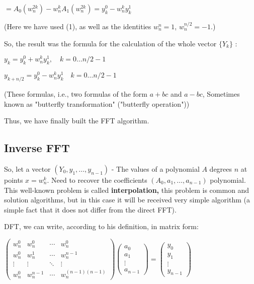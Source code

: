 $=A_{0}(w_{n}^{2k})-w_{n}^{k}A_{1}(w_{n}^{2k})=y_{k}^{0}-w_{n}^{k}y_{k}^{1}$

(Here we have used (1), as well as the identities $w_n ^ n = 1$, $w_n ^ {n / 2} = -1$.)

So, the result was the formula for the calculation of the whole vector $\{Y_k \}$ :

$y_{k}=y_{k}^{0}+w_{n}^{k}y_{k}^{1},\quad k=0\ldots n/2-1$

$y_{k+n/2}=y_{k}^{0}-w_{n}^{k}y_{k}^{1}\quad k=0\ldots n/2-1$

(These formulas, i.e., two formulas of the form $a + bc$ and $a-bc$, Sometimes known as "butterfly transformation" ("butterfly operation"))

Thus, we have finally built the FFT algorithm.

\subsection{ Inverse FFT }

So, let a vector $(Y_0, y_1, \ldots, y_ {n-1})$ - The values ​​of a polynomial $A$ degrees $n$ at points $x = w_n ^ k$. Need to recover the coefficients $(A_0, a_1, \ldots, a_ {n-1})$ polynomial. This well-known problem is called \textbf{interpolation,} this problem is common and solution algorithms, but in this case it will be received very simple algorithm (a simple fact that it does not differ from the direct FFT).

DFT, we can write, according to his definition, in matrix form:

$\begin{pmatrix}w_{n}^{0} & w_{n}^{0} & \cdots & w_{n}^{0}\\
w_{n}^{0} & w_{n}^{1} & \cdots & w_{n}^{n-1}\\
\vdots & \vdots & \ddots & \vdots\\
w_{n}^{0} & w_{n}^{n-1} & \cdots & w_{n}^{(n-1)(n-1)}
\end{pmatrix}\begin{pmatrix}a_{0}\\
a_{1}\\
\vdots\\
a_{n-1}
\end{pmatrix}=\begin{pmatrix}y_{0}\\
y_{1}\\
\vdots\\
y_{n-1}
\end{pmatrix}$

